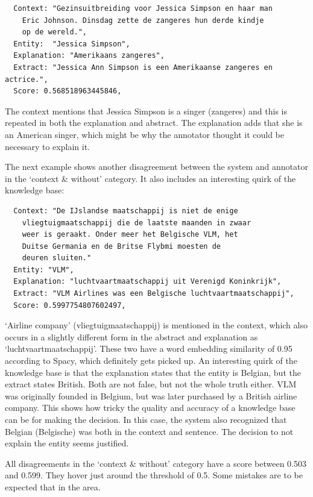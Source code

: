 \documentclass[
10pt, %
a4paper, %
oneside, %
headinclude,footinclude, %
] {book}%
\begin{document}
\begin{verbatim}
  Context: "Gezinsuitbreiding voor Jessica Simpson en haar man
    Eric Johnson. Dinsdag zette de zangeres hun derde kindje
    op de wereld.",
  Entity:  "Jessica Simpson",
  Explanation: "Amerikaans zangeres",
  Extract: "Jessica Ann Simpson is een Amerikaanse zangeres en actrice.",
  Score: 0.568518963445846,
\end{verbatim}

The context mentions that Jessica Simpson is a singer (zangeres) and this is repeated in both the explanation and abstract.
The explanation adds that she is an American singer, which might be why the annotator thought it could be necessary to explain it.

The next example shows another disagreement between the system and annotator in the `context \& without' category.
It also includes an interesting quirk of the knowledge base:

\begin{verbatim}
  Context: "De IJslandse maatschappij is niet de enige
    vliegtuigmaatschappij die de laatste maanden in zwaar
    weer is geraakt. Onder meer het Belgische VLM, het
    Duitse Germania en de Britse Flybmi moesten de
    deuren sluiten."
  Entity: "VLM",
  Explanation: "luchtvaartmaatschappij uit Verenigd Koninkrijk",
  Extract: "VLM Airlines was een Belgische luchtvaartmaatschappij",
  Score: 0.5997754807602497,
\end{verbatim}

`Airline company' (vliegtuigmaatschappij) is mentioned in the context, which also occurs in a slightly different form in the abstract and explanation as `luchtvaartmaatschappij'.
These two have a word embedding similarity of 0.95 according to Spacy, which definitely gets picked up.
An interesting quirk of the knowledge base is that the explanation states that the entity is Belgian, but the extract states British.
Both are not false, but not the whole truth either.
VLM was originally founded in Belgium, but was later purchased by a British airline company.
This shows how tricky the quality and accuracy of a knowledge base can be for making the decision.
In this case, the system also recognized that Belgian (Belgische) was both in the context and sentence.
The decision to not explain the entity seems justified.

All disagreements in the `context \& without' category have a score between 0.503 and 0.599.
They hover just around the threshold of 0.5.
Some mistakes are to be expected that in the area.
\end{document}
